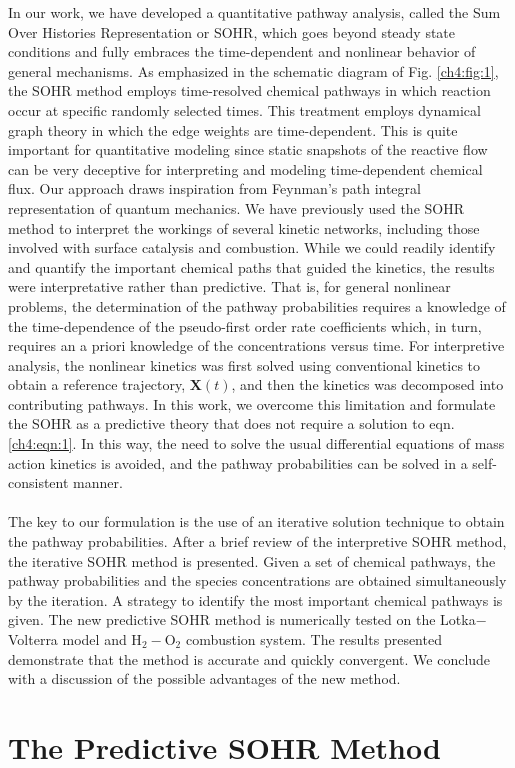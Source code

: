 In our work, we have developed a quantitative pathway
analysis, called the Sum Over Histories Representation or
SOHR, which goes beyond steady state conditions and fully
embraces the time-dependent and nonlinear behavior of
general mechanisms. As emphasized in the schematic diagram
of Fig. \ref{ch4:fig:1}, the SOHR method employs time-resolved chemical pathways in which reaction occur at specific randomly selected
times. This treatment employs dynamical graph theory\cite{ch4_25_harary1997dynamic} in
which the edge weights are time-dependent. This is quite
important for quantitative modeling since static snapshots of
the reactive flow can be very deceptive for interpreting and
modeling time-dependent chemical flux. Our approach draws
inspiration from Feynman’s path integral representation of
quantum mechanics.\cite{ch4_26_feynman2010quantum} We have previously used the SOHR
method to interpret the workings of several kinetic networks,
including those involved with surface catalysis and combustion.
While we could readily identify and quantify the important
chemical paths that guided the kinetics, the results were
interpretative rather than predictive. That is, for general
nonlinear problems, the determination of the pathway
probabilities requires a knowledge of the time-dependence of
the pseudo-first order rate coefficients which, in turn, requires
an a priori knowledge of the concentrations versus time. For
interpretive analysis, the nonlinear kinetics was first solved
using conventional kinetics to obtain a reference trajectory,
$\mathbf{X}(t)$, and then the kinetics was decomposed into contributing
pathways. In this work, we overcome this limitation and formulate the SOHR as a predictive theory that does not
require a solution to eqn. \ref{ch4:eqn:1}. In this way, the need to solve the
usual differential equations of mass action kinetics is avoided,
and the pathway probabilities can be solved in a self-consistent
manner.
\newline
\paragraph{}
The key to our formulation is the use of an iterative solution
technique to obtain the pathway probabilities. After a brief
review of the interpretive SOHR method, the iterative SOHR
method is presented. Given a set of chemical pathways, the
pathway probabilities and the species concentrations are
obtained simultaneously by the iteration. A strategy to identify
the most important chemical pathways is given. The new
predictive SOHR method is numerically tested on the Lotka$−$
Volterra model and H$_2-$O$_2$ combustion system. The results
presented demonstrate that the method is accurate and quickly
convergent. We conclude with a discussion of the possible
advantages of the new method.
\section{The Predictive SOHR Method}
